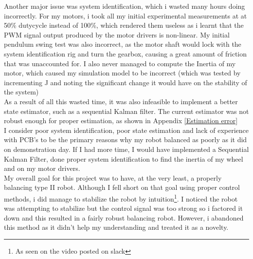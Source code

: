 \documentclass{UoNMCHA}
\numberwithin{equation}{section}
\begin{document}
Another major issue was system identification, which i wasted many hours doing incorrectly. For my motors, i took all my initial experimental measurements at at 50\% dutycycle instead of 100\%, which rendered them useless as i learnt that the PWM signal output produced by the motor drivers is non-linear. My initial pendulum swing test was also incorrect, as the motor shaft would lock with the system identification rig and turn the gearbox, causing a great amount of friction that was unaccounted for. I also never managed to compute the Inertia of my motor, which caused my simulation model to be incorrect (which was  tested by incrementing J and noting the significant change it would have on the stability of the system)\\

As a result of all this wasted time, it was also infeasible to implement a better state estimator, such as a sequential Kalman filter. The current estimator was not robust enough for proper estimation, as shown in Appendix \ref{Estimation error}\\

I consider poor system identification, poor state estimation and lack of experience with PCB's to be the primary reasons why my robot balanced as poorly as it did on demonstration day. If I had more time, I would have implemented a Sequential Kalman Filter, done proper system identification to find the inertia of my wheel and on my motor drivers. \\

My overall goal for this project was to have, at the very least, a properly balancing type II robot. Although I fell short on that goal using proper control methods, i did manage to stabilize the robot by intuition\footnote{As seen on the video posted on slack}. I noticed the robot was attempting to stabilize but the control signal was too strong so i factored it down and this resulted in a fairly robust balancing robot. However, i abandoned this method as it didn't help my understanding and treated it as a novelty.
\end{document}
